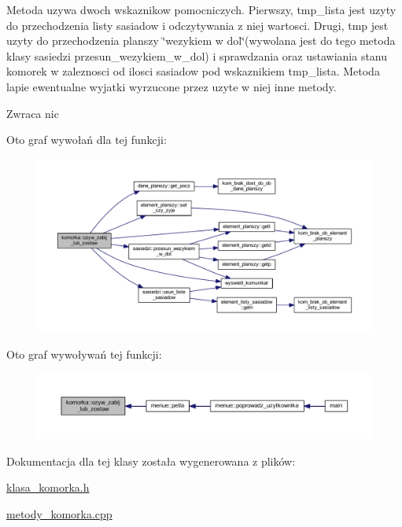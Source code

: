 Metoda uzywa dwoch wskaznikow pomocniczych. Pierwszy, tmp\+\_\+lista jest uzyty do przechodzenia listy sasiadow i odczytywania z niej wartosci. Drugi, tmp jest uzyty do przechodzenia planszy \char`\"{}wezykiem w dol\char`\"{}(wywolana jest do tego metoda klasy sasiedzi przesun\+\_\+wezykiem\+\_\+w\+\_\+dol) i sprawdzania oraz ustawiania stanu komorek w zaleznosci od ilosci sasiadow pod wskaznikiem tmp\+\_\+lista. Metoda lapie ewentualne wyjatki wyrzucone przez uzyte w niej inne metody. \begin{DoxyReturn}{Zwraca}
nic 
\end{DoxyReturn}
Oto graf wywołań dla tej funkcji\+:
\nopagebreak
\begin{figure}[H]
\begin{center}
\leavevmode
\includegraphics[width=350pt]{classkomorka_adce4e335e2839bbb388cfb9f43ddd51e_cgraph}
\end{center}
\end{figure}
Oto graf wywoływań tej funkcji\+:
\nopagebreak
\begin{figure}[H]
\begin{center}
\leavevmode
\includegraphics[width=350pt]{classkomorka_adce4e335e2839bbb388cfb9f43ddd51e_icgraph}
\end{center}
\end{figure}


Dokumentacja dla tej klasy została wygenerowana z plików\+:\begin{DoxyCompactItemize}
\item 
\mbox{\hyperlink{klasa__komorka_8h}{klasa\+\_\+komorka.\+h}}\item 
\mbox{\hyperlink{metody__komorka_8cpp}{metody\+\_\+komorka.\+cpp}}\end{DoxyCompactItemize}
